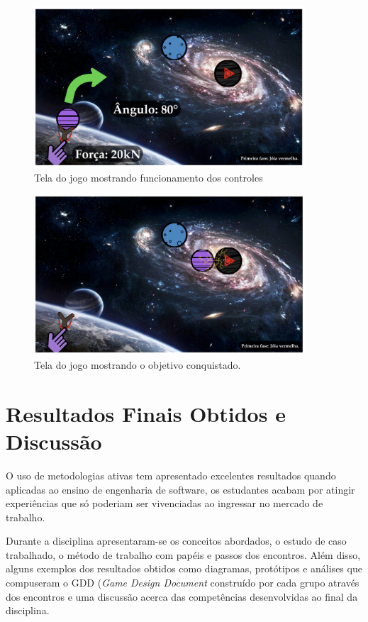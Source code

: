 \documentclass[12pt, onecolumn]{IEEEtran}
\begin{document}
    \begin{figure}[H]
    \centering
    \includegraphics[width=0.9\textwidth]{imagens/grupo2-img2.png}
    \caption{Tela do jogo mostrando funcionamento dos controles}
    \label{fig:mesh1}
\end{figure}

    \begin{figure}[H]
    \centering
    \includegraphics[width=0.9\textwidth]{imagens/grupo2-img3.png}
    \caption{Tela do jogo mostrando o objetivo conquistado.}
    \label{fig:mesh1}
\end{figure}

\section{Resultados Finais Obtidos e Discussão}

O uso de metodologias ativas tem apresentado excelentes resultados quando aplicadas ao ensino de engenharia de software, os estudantes acabam por atingir experiências que só poderiam ser vivenciadas ao ingressar no mercado de trabalho\cite{b21}.

Durante a disciplina apresentaram-se os conceitos abordados, o estudo de caso trabalhado, o método de trabalho com papéis e passos dos encontros. Além disso, alguns exemplos dos resultados obtidos como diagramas, protótipos e análises que compuseram o GDD (\textit{Game Design Document} construído por cada grupo através dos encontros e uma discussão acerca das competências desenvolvidas ao final da disciplina.
\end{document}
